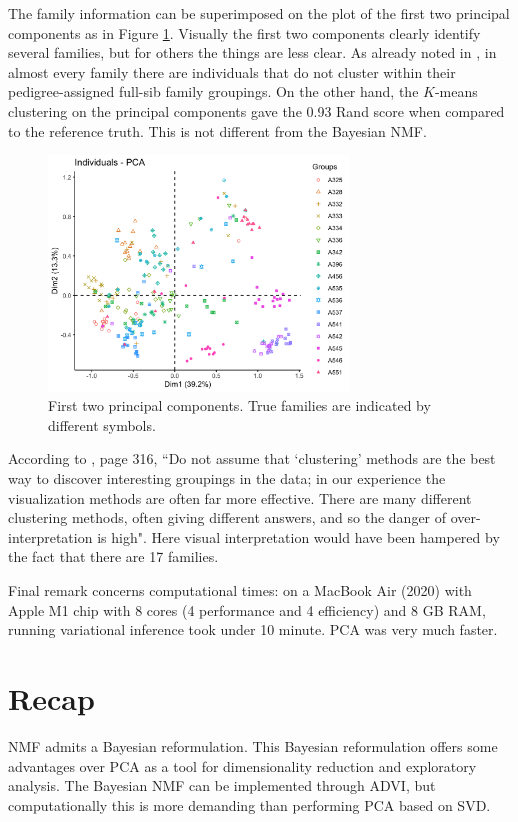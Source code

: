 \documentclass[]{article}
\begin{document}
The family information can be superimposed on the plot of the first two principal components as in Figure \ref{fig:pca_families_apple}. Visually the first two components clearly identify several families, but for others the things are less clear. As already noted in \citet{kumar2015}, in almost every family there are individuals that do not cluster within their pedigree-assigned full-sib family groupings. On the other hand, the $K$-means clustering on the principal components gave the 0.93 Rand score when compared to the reference truth. This is not different from the Bayesian NMF.

\begin{figure}
	\centering
	\includegraphics[width=8cm]{pca_families_apple.png}
	\caption{First two principal components. True families are indicated by different symbols.}
	\label{fig:pca_families_apple}
\end{figure}

According to \citet{venables2002}, page 316, ``Do not assume that `clustering' methods are the best way to discover interesting groupings in the data; in our experience the visualization methods are often far more effective. There are many different clustering methods, often giving different answers, and so the danger of over-interpretation is high". Here visual interpretation would have been hampered by the fact that there are 17 families. 

Final remark concerns computational times: on a MacBook Air (2020) with Apple M1 chip with 8 cores (4 performance and 4 efficiency) and 8 GB RAM, running variational inference took under 10 minute. PCA was very much faster.

\section{Recap}

NMF admits a Bayesian reformulation. This Bayesian reformulation offers some advantages over PCA as a tool for dimensionality reduction and exploratory analysis. The Bayesian NMF can be implemented through ADVI, but computationally this is more demanding than performing PCA based on SVD.



\end{document}
